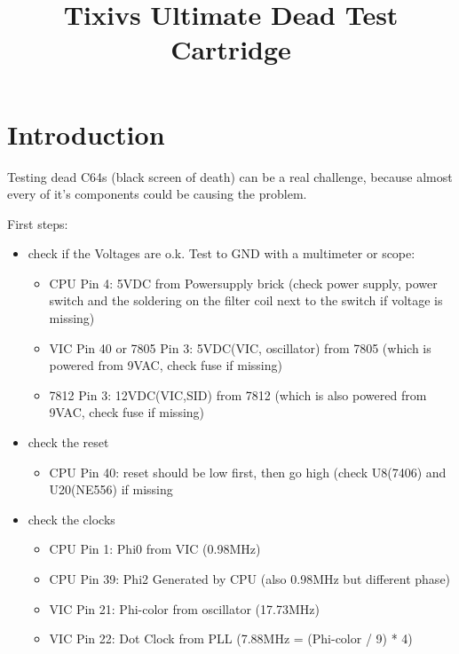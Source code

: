 \documentclass[11pt]{article} %
\title{Tixivs Ultimate Dead Test Cartridge}
\author{}
\date{} %
\begin{document}
\maketitle


\tableofcontents

\newpage

\section{Introduction}

Testing dead C64s (black screen of death) can be a real challenge, because almost every of it's components could be causing the problem.

First steps:
\begin{itemize}
    \item check if the Voltages are o.k. Test to GND with a multimeter or scope:
	\begin{itemize}
		\item CPU Pin 4: 5VDC from Powersupply brick (check power supply, power switch and the soldering on the filter coil next to the switch if voltage is missing)
		\item VIC Pin 40 or 7805 Pin 3: 5VDC(VIC, oscillator) from 7805 (which is powered from 9VAC, check fuse if missing)
		\item 7812 Pin 3: 12VDC(VIC,SID) from 7812 (which is also powered from 9VAC, check fuse if missing)
	\end{itemize}
    \item check the reset
	\begin{itemize}
		\item CPU Pin 40: reset should be low first, then go high (check U8(7406) and U20(NE556) if missing
	\end{itemize}
    \item check the clocks
	\begin{itemize}
		\item CPU Pin 1: Phi0 from VIC (0.98MHz)
		\item CPU Pin 39: Phi2 Generated by CPU (also 0.98MHz but different phase)
		\item VIC Pin 21: Phi-color from oscillator (17.73MHz)
		\item VIC Pin 22: Dot Clock from PLL (7.88MHz = (Phi-color / 9) * 4)
	\end{itemize}	
\end{itemize}
\end{document}

